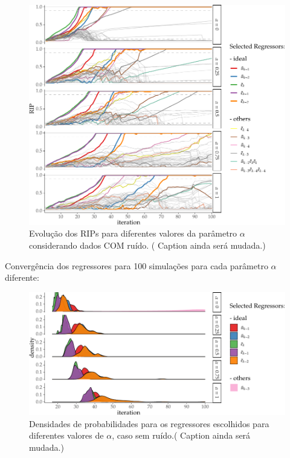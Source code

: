 \begin{exmp}
  \begin{figure}[H]
    \centering
    \includegraphics{Figs/Cap5/ex51_rips_evol_CR.tex.pdf}
    \caption{Evolução dos RIPs para diferentes valores da parâmetro $\alpha$ considerando dados COM ruído. ({\color{red} Caption ainda será mudada.})}
    \label{fig:exp51_ev_rips_a1}
  \end{figure}



  Convergência dos regressores para 100 simulações para cada parâmetro $\alpha$ diferente:

  \begin{figure}[H]
    \centering
    \includegraphics{Figs/Cap5/ex51_iter_con_SEM_ruido.tex.pdf}
    \caption{Densidades de probabilidades para os regressores escolhidos para diferentes valores de $\alpha$, caso sem ruído.({\color{red} Caption ainda será mudada.})}
    \label{fig:exp51_itercon_ruido}
  \end{figure}


\end{exmp}
